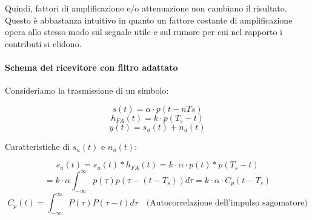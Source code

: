 Quindi, fattori di amplificazione e/o attenuazione non cambiano il risultato. Questo è abbastanza intuitivo in quanto un fattore costante di amplificazione opera allo stesso modo sul segnale utile e sul rumore per cui nel rapporto i contributi si elidono.

\paragraph*{Schema del ricevitore con filtro adattato}

Consideriamo la trasmissione di un simbolo:

\begin{center}
\end{center}

\[ s(t) = \alpha \cdot p(t-nTs) \]
\[ h_{FA}(t) = k \cdot p(T_s - t) \]
\[ y(t) = s_u(t) + n_u(t) \]

Caratteristiche di \( s_u(t) \) e \( n_u(t) \):

\[ s_u(t) = s_u(t) \ast h_{FA}(t) = k \cdot \alpha \cdot p(t) \ast p(T_s - t) \]
\[ = k \cdot \alpha \int_{-\infty}^{\infty} p(\tau) p(\tau - (t - T_s)) d\tau = k \cdot \alpha \cdot C_p (t - T_s) \]
\[ C_p(t) = \int_{-\infty}^{\infty} P(\tau) P(\tau - t) d\tau \quad \text{(Autocorrelazione dell'impulso sagomatore)}
\]

